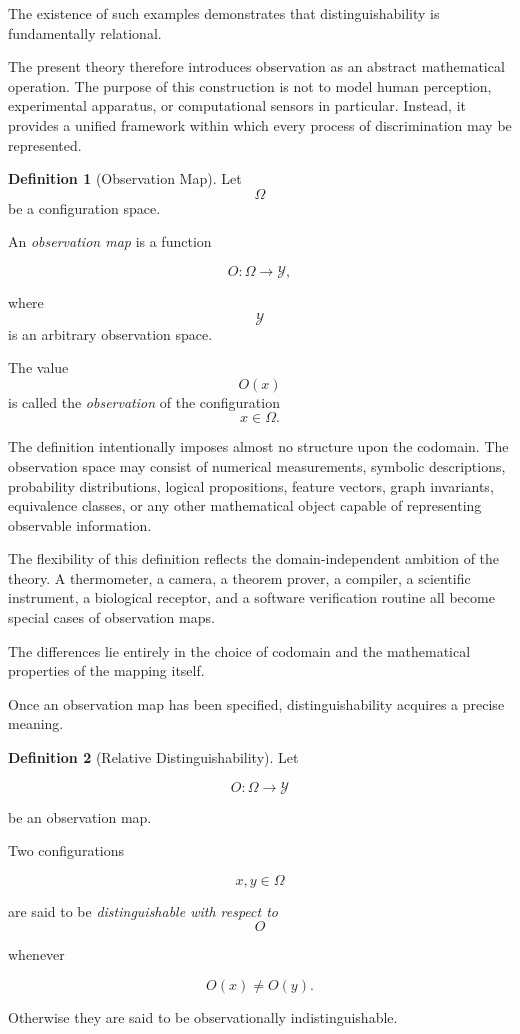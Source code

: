 \documentclass[11pt]{book}
\numberwithin{equation}{chapter}
\theoremstyle{definition}
\newtheorem{definition}{Definition}[chapter]
\theoremstyle{plain}
\begin{document}
The existence of such examples demonstrates that distinguishability is fundamentally relational.

The present theory therefore introduces observation as an abstract mathematical operation. The purpose of this construction is not to model human perception, experimental apparatus, or computational sensors in particular. Instead, it provides a unified framework within which every process of discrimination may be represented.

\begin{definition}[Observation Map]

Let
\[
\Omega
\]
be a configuration space.

An \emph{observation map} is a function

\[
O:\Omega\rightarrow\mathcal{Y},
\]

where
\[
\mathcal{Y}
\]
is an arbitrary observation space.

The value
\[
O(x)
\]
is called the \emph{observation} of the configuration
\[
x\in\Omega.
\]

\end{definition}

The definition intentionally imposes almost no structure upon the codomain. The observation space may consist of numerical measurements, symbolic descriptions, probability distributions, logical propositions, feature vectors, graph invariants, equivalence classes, or any other mathematical object capable of representing observable information.

The flexibility of this definition reflects the domain-independent ambition of the theory. A thermometer, a camera, a theorem prover, a compiler, a scientific instrument, a biological receptor, and a software verification routine all become special cases of observation maps.

The differences lie entirely in the choice of codomain and the mathematical properties of the mapping itself.

Once an observation map has been specified, distinguishability acquires a precise meaning.

\begin{definition}[Relative Distinguishability]

Let

\[
O:\Omega\rightarrow\mathcal{Y}
\]

be an observation map.

Two configurations

\[
x,y\in\Omega
\]

are said to be \emph{distinguishable with respect to}
\[
O
\]

whenever

\[
O(x)\neq O(y).
\]

Otherwise they are said to be observationally indistinguishable.

\end{definition}
\end{document}
